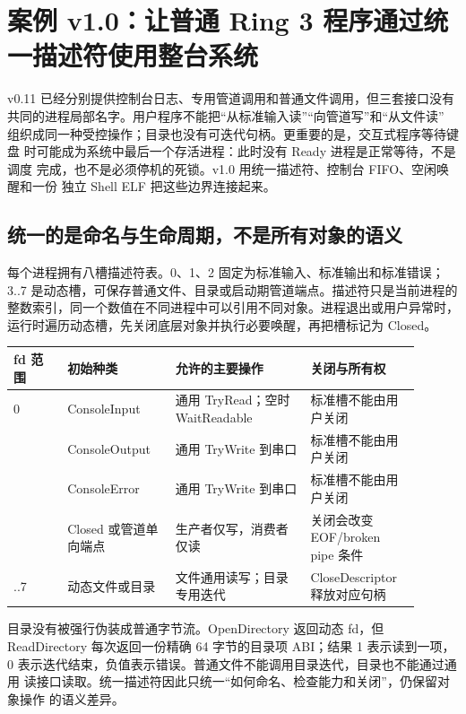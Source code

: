 \section{案例 v1.0：让普通 Ring 3 程序通过统一描述符使用整台系统}

v0.11 已经分别提供控制台日志、专用管道调用和普通文件调用，但三套接口没有
共同的进程局部名字。用户程序不能把“从标准输入读”“向管道写”和“从文件读”
组织成同一种受控操作；目录也没有可迭代句柄。更重要的是，交互式程序等待键盘
时可能成为系统中最后一个存活进程：此时没有 Ready 进程是正常等待，不是调度
完成，也不是必须停机的死锁。v1.0 用统一描述符、控制台 FIFO、空闲唤醒和一份
独立 Shell ELF 把这些边界连接起来。

\subsection{统一的是命名与生命周期，不是所有对象的语义}

每个进程拥有八槽描述符表。0、1、2 固定为标准输入、标准输出和标准错误；
3..7 是动态槽，可保存普通文件、目录或启动期管道端点。描述符只是当前进程的
整数索引，同一个数值在不同进程中可以引用不同对象。进程退出或用户异常时，
运行时遍历动态槽，先关闭底层对象并执行必要唤醒，再把槽标记为 Closed。

\begin{longtable}{|L{0.12\linewidth}|L{0.24\linewidth}|L{0.30\linewidth}|L{0.24\linewidth}|}
\toprule
fd 范围 & 初始种类 & 允许的主要操作 & 关闭与所有权 \\
 & ConsoleInput & 通用 TryRead；空时 WaitReadable & 标准槽不能由用户关闭 \\ & ConsoleOutput & 通用 TryWrite 到串口 & 标准槽不能由用户关闭 \\ & ConsoleError & 通用 TryWrite 到串口 & 标准槽不能由用户关闭 \\ & Closed 或管道单向端点 & 生产者仅写，消费者仅读 & 关闭会改变 EOF/broken pipe 条件 \\..7 & 动态文件或目录 & 文件通用读写；目录专用迭代 & CloseDescriptor 释放对应句柄 \\
\bottomrule
\end{longtable}

目录没有被强行伪装成普通字节流。OpenDirectory 返回动态 fd，但
ReadDirectory 每次返回一份精确 64 字节的目录项 ABI；结果 1 表示读到一项，
0 表示迭代结束，负值表示错误。普通文件不能调用目录迭代，目录也不能通过通用
读接口读取。统一描述符因此只统一“如何命名、检查能力和关闭”，仍保留对象操作
的语义差异。

